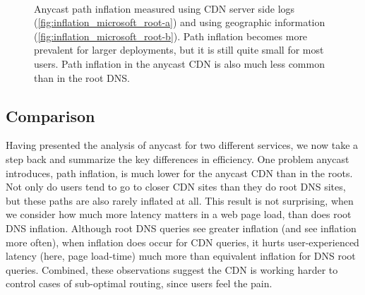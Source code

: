 \documentclass[sigconf,letterpaper,nonacm,10pt,anonymous]{acmart}
\begin{document}
\begin{figure}
    \centering
     \\
    \caption{Anycast path inflation measured using CDN server side logs (\ref{fig:inflation_microsoft_root-a}) and using geographic information (\ref{fig:inflation_microsoft_root-b}). Path inflation becomes more prevalent for larger deployments, but it is still quite small for most users. Path inflation in the anycast CDN is also much less common than in the root DNS.}
    \label{fig:inflation_microsoft_root}
\end{figure}

\subsection{Comparison}\label{comparison-3}

Having presented the analysis of anycast for two different services, we
now take a step back and summarize the key differences in efficiency.
One problem anycast introduces, path inflation, is much lower for the
anycast CDN than in the roots. Not only do users tend to go to closer
CDN sites than they do root DNS sites, but these paths are also rarely
inflated at all. This result is not surprising, when we consider how
much more latency matters in a web page load, than does root DNS
inflation. Although root DNS queries see greater inflation (and see
inflation more often), when inflation does occur for CDN queries, it
hurts user-experienced latency (here, page load-time) much more than
equivalent inflation for DNS root queries. Combined, these observations
suggest the CDN is working harder to control cases of sub-optimal
routing, since users feel the pain.
\end{document}
